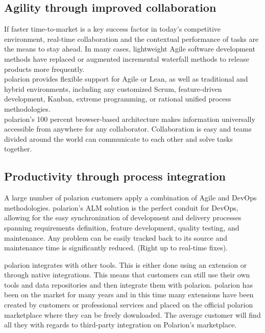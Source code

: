\documentclass[thesis=M,english]{FITthesis}[2012/06/26]
\begin{document}
\subsection{Agility through improved collaboration}

If faster time-to-market is a key success factor in today’s competitive environment, real-time collaboration and the contextual performance 
of tasks are the means to stay ahead. In many cases, lightweight Agile software development methods have replaced or augmented incremental waterfall methods to release products more frequently.\\

\acrshort{polarion} provides flexible support for Agile or Lean, as well as traditional and hybrid environments, including any customized Scrum, feature-driven development, Kanban, extreme programming, or rational unified process methodologies.\\

\acrshort{polarion}'s 100 percent browser-based architecture makes information universally accessible from anywhere for any collaborator. Collaboration is easy and teams divided around the world can communicate to each other and solve tasks together.\\

\subsection{Productivity through process integration}

A large number of \acrshort{polarion} customers apply a combination of Agile and DevOps methodologies. \acrshort{polarion}'s ALM solution is the perfect conduit for DevOps, allowing for the easy synchronization of development and delivery processes spanning requirements definition, feature development, quality testing, and maintenance. Any problem can be easily tracked back to its source and maintenance time is significantly reduced. (Right up to real-time fixes).

\acrshort{polarion} integrates with other tools. This is either done using an extension or through native integrations. This means that customers can still use their own tools and data repositories and then integrate them with \acrshort{polarion}. \acrshort{polarion} has been on the market for many years and in this time many extensions have been created by customers or professional services and placed on the official \acrshort{polarion} marketplace where they can be freely downloaded. The average customer will find all they with regards to third-party integration on Polarion's marketplace.  
\end{document}
